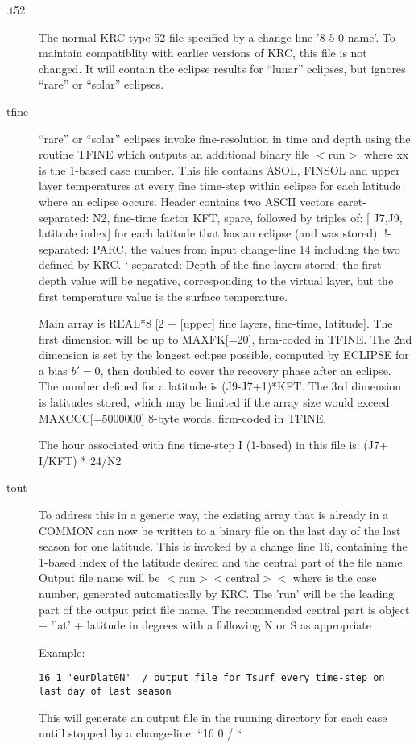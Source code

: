 \documentclass{article}
\begin{document}
\begin{description} 
 
 \item [.t52] The normal KRC type 52 file specified by a change line '8 5 0
   name'.  To maintain compatiblity with earlier versions of KRC, this file is
   not changed. It will contain the eclipse results for ``lunar'' eclipses, but
   ignores ``rare'' or ``solar'' eclipses.
 
 \item [tfine] ``rare'' or ``solar'' eclipses invoke fine-resolution in time and
   depth using the routine TFINE which outputs an additional binary file
   $<$run$>$ where xx is the 1-based case number. This file
   contains ASOL, FINSOL and upper layer temperatures at every fine time-step
   within eclipse for each latitude where an eclipse occurs. Header contains two
   ASCII vectors
\qi caret-separated: N2, fine-time factor KFT, spare, followed by triples of: 
[ J7,J9, latitude index] for each latitude that has an eclipse (and was stored).
\qi !-separated: PARC, the values from input change-line 14 including the two defined by KRC.
\qi `-separated: Depth of the fine layers stored; the first depth value will 
be negative, corresponding to the virtual layer, 
\qii but the first temperature value is the surface temperature.

Main array is REAL*8 [2 + [upper] fine layers, fine-time, latitude]. The first
dimension will be up to MAXFK[=20], firm-coded in TFINE. The 2nd dimension is
set by the longest eclipse possible, computed by ECLIPSE for a bias $b'=0$, then
doubled to cover the recovery phase after an eclipse.  The number defined for a
latitude is (J9-J7+1)*KFT. The 3rd
dimension is latitudes stored, which may be limited if the array size would
exceed MAXCCC[=5000000] 8-byte words, firm-coded in TFINE.

The hour associated with fine time-step I (1-based) in this file is: (J7+ I/KFT) * 24/N2

 \item [tout]
To address this in a generic way, the existing array  that is already
in a COMMON can now be written to a binary file on the last day of the last
season for one latitude.  This is invoked by a change line 16, containing the
1-based index of the latitude desired and the central part of the file
name. Output file name will be $<$run$><$central$><$  where 
is the case number, generated automatically by KRC. The 'run' will be the
leading part of the output print file name.  The recommended central part is
\qi object
\qi + 'lat'
\qi + latitude in degrees with a following N or S as appropriate

Example: \vspace{-3.mm} 
\begin{verbatim}
16 1 'eurDlat0N'  / output file for Tsurf every time-step on last day of last season
\end{verbatim} 

This will generate an output file in the running directory for each case untill
stopped by a change-line: ``16 0 / ``
 
\end{description}
\end{document}

